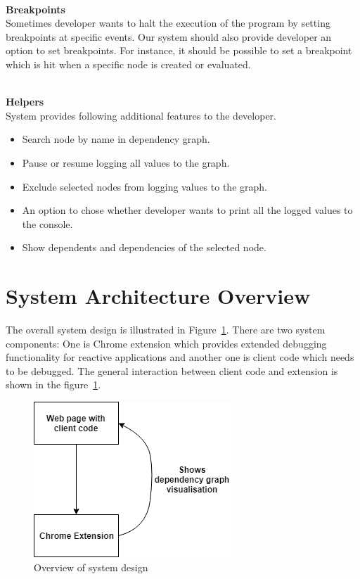 \leavevmode
\\
\textbf{Breakpoints}
\\
Sometimes developer wants to halt the execution of the program by setting breakpoints at specific events. Our system should also provide developer an option to set breakpoints. For instance, it should be possible to set a breakpoint which is hit when a specific node is created or evaluated. 

\leavevmode
\\
\textbf{Helpers}
\\
System provides following additional features to the developer.

\begin{itemize}
	\item Search node by name in dependency graph.
	\item Pause or resume logging all values to the graph.
	\item Exclude selected nodes from logging values to the graph.
	\item An option to chose whether developer wants to print all the logged values to the console.
	\item Show dependents and dependencies of the selected node.
\end{itemize}

\section{System Architecture Overview}
The overall system design is illustrated in Figure~\ref{fig:system-design}. There are two system components: One is Chrome extension which provides extended debugging functionality for reactive applications and another one is client code which needs to be debugged. The general interaction between client code and extension is shown in the figure~\ref{fig:system-design}. 

\begin{figure}[!h]
	\centering
	\includegraphics[scale=0.6,trim=0 0 0 0]{images/system-design.png}
	\caption{Overview of system design}
	\label{fig:system-design}
\end{figure}

